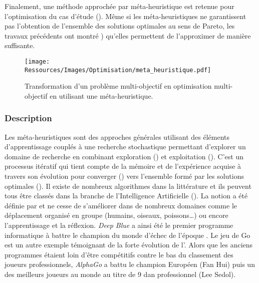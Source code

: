 Finalement, une méthode approchée par méta-heuristique est retenue pour l’optimisation du
cas d’étude (). Même si les méta-heuristiques ne garantissent pas
l’obtention de l’ensemble des solutions optimales au sens de Pareto, les travaux
précédents ont montré \parencite{Rivallain2013,Recht2016}) qu’elles permettent de
l’approximer de manière suffisante.

\begin{figure}
    \centering
    \texttt{[image: Ressources/Images/Optimisation/meta\_heuristique.pdf]}
    \caption{Transformation d’un problème multi-objectif en optimisation
             multi-objectif en utilisant une méta-heuristique.}
    \label{fig:multi_meta}
\end{figure}

\subsubsection{Description} %
\label{ssub:description_meta}
Les méta-heuristiques sont des approches générales utilisant des éléments d’apprentissage
couplés à une recherche stochastique permettant d’explorer un domaine de recherche en
combinant exploration () et exploitation
(). C’est un processus itératif qui tient compte de la
mémoire et de l’expérience acquise à travers son évolution pour converger
() vers l’ensemble formé par les solutions optimales
(). Il existe de nombreux algorithmes dans la littérature et
ils peuvent tous être classés dans la branche de l’Intelligence Artificielle (). La
notion a été définie par
 et ne cesse de s’améliorer dans de nombreux domaines comme le
déplacement organisé en groupe (humains, oiseaux, poissons\dots) ou encore l’apprentissage
et la réflexion. \textit{Deep Blue} a ainsi été le premier programme informatique à battre
le champion du monde d’échec de l’époque \parencite{Hsu199970}. Le jeu de Go est un autre
exemple témoignant de la forte évolution de l’. Alors que les anciens programmes étaient
loin d’être compétitifs contre le bas du classement des joueurs professionnels,
\textit{AlphaGo} \parencite{Silver2016484} a battu le champion Européen (Fan Hui) puis un
des meilleurs joueurs au monde au titre de 9 dan professionnel (Lee Sedol).

